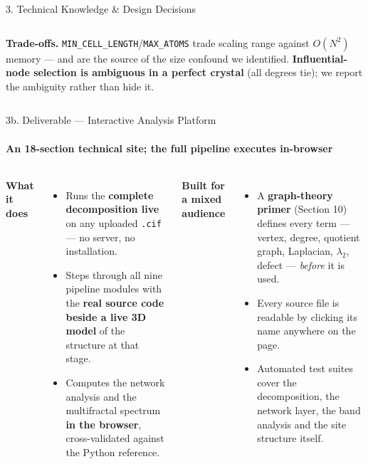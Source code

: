 \documentclass[aspectratio=169, 11pt]{beamer}
\begin{document}
\begin{frame}{3. Technical Knowledge \& Design Decisions}
\begin{columns}[T]
{\tiny
\textbf{Trade-offs.} \texttt{MIN\_CELL\_LENGTH}/\texttt{MAX\_ATOMS} trade scaling range
against $O(N^2)$ memory --- and are the source of the size confound we identified.
\textbf{Influential-node selection is ambiguous in a perfect crystal} (all degrees tie);
we report the ambiguity rather than hide it.}
\end{columns}
\end{frame}

\begin{frame}{3b. Deliverable --- Interactive Analysis Platform}
\framesubtitle{An 18-section technical site; the full pipeline executes in-browser}
{\footnotesize
\begin{columns}[T]
\textbf{What it does}
\begin{itemize}\scriptsize
  \item Runs the \textbf{complete decomposition live} on any uploaded \texttt{.cif} ---
        no server, no installation.
  \item Steps through all nine pipeline modules with the \textbf{real source code beside a
        live 3D model} of the structure at that stage.
  \item Computes the network analysis and the multifractal spectrum \textbf{in the browser},
        cross-validated against the Python reference.
\end{itemize}
\textbf{Built for a mixed audience}
\begin{itemize}\scriptsize
  \item A \textbf{graph-theory primer} (Section 10) defines every term --- vertex, degree,
        quotient graph, Laplacian, $\lambda_2$, defect --- \textit{before} it is used.
  \item Every source file is readable by clicking its name anywhere on the page.
  \item Automated test suites cover the decomposition, the network layer, the band analysis
        and the site structure itself.
\end{itemize}
\end{columns}}
\end{frame}
\end{document}

